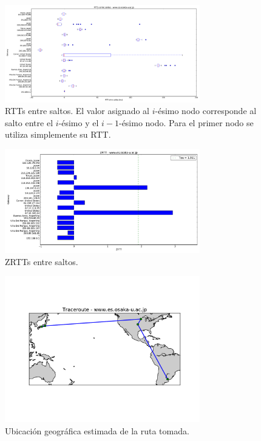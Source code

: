 
\begin{figure}[H]
    \centering
    \includegraphics[width=8.5cm]{img/grafico1-www-es-osaka-u-ac-jp.pdf}
    \caption{\normalfont RTTs entre saltos. El valor asignado al $i$-ésimo nodo corresponde al salto entre el $i$-ésimo y el $i - 1$-ésimo nodo. Para el primer nodo se utiliza simplemente su RTT.}
\end{figure}

\begin{figure}[H]
    \centering
    \includegraphics[width=8.5cm]{img/grafico2-www-es-osaka-u-ac-jp.pdf}
    \caption{\normalfont ZRTTs entre saltos.}
\end{figure}

\begin{figure}[H]
    \centering
    \includegraphics[width=8.5cm]{img/grafico3-www-es-osaka-u-ac-jp.pdf}
    \caption{\normalfont Ubicación geográfica estimada de la ruta tomada.}
\end{figure}
